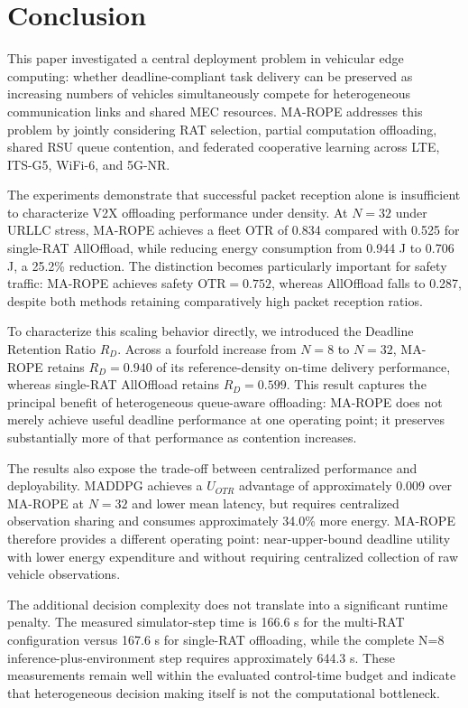 \section{Conclusion}

This paper investigated a central deployment problem in vehicular edge computing: whether deadline-compliant task delivery can be preserved as increasing numbers of vehicles simultaneously compete for heterogeneous communication links and shared MEC resources. MA-ROPE addresses this problem by jointly considering RAT selection, partial computation offloading, shared RSU queue contention, and federated cooperative learning across LTE, ITS-G5, WiFi-6, and 5G-NR.

The experiments demonstrate that successful packet reception alone is insufficient to characterize V2X offloading performance under density. At $N=32$ under URLLC stress, MA-ROPE achieves a fleet OTR of 0.834 compared with 0.525 for single-RAT AllOffload, while reducing energy consumption from 0.944 J to 0.706 J, a 25.2\% reduction. The distinction becomes particularly important for safety traffic: MA-ROPE achieves safety $\text{OTR}=0.752$, whereas AllOffload falls to 0.287, despite both methods retaining comparatively high packet reception ratios.

To characterize this scaling behavior directly, we introduced the Deadline Retention Ratio $R_D$. Across a fourfold increase from $N=8$ to $N=32$, MA-ROPE retains $R_D=0.940$ of its reference-density on-time delivery performance, whereas single-RAT AllOffload retains $R_D=0.599$. This result captures the principal benefit of heterogeneous queue-aware offloading: MA-ROPE does not merely achieve useful deadline performance at one operating point; it preserves substantially more of that performance as contention increases.

The results also expose the trade-off between centralized performance and deployability. MADDPG achieves a $U_{OTR}$ advantage of approximately 0.009 over MA-ROPE at $N=32$ and lower mean latency, but requires centralized observation sharing and consumes approximately 34.0\% more energy. MA-ROPE therefore provides a different operating point: near-upper-bound deadline utility with lower energy expenditure and without requiring centralized collection of raw vehicle observations.

The additional decision complexity does not translate into a significant runtime penalty. The measured simulator-step time is 166.6 \textmu s for the multi-RAT configuration versus 167.6 \textmu s for single-RAT offloading, while the complete N=8 inference-plus-environment step requires approximately 644.3 \textmu s. These measurements remain well within the evaluated control-time budget and indicate that heterogeneous decision making itself is not the computational bottleneck.

